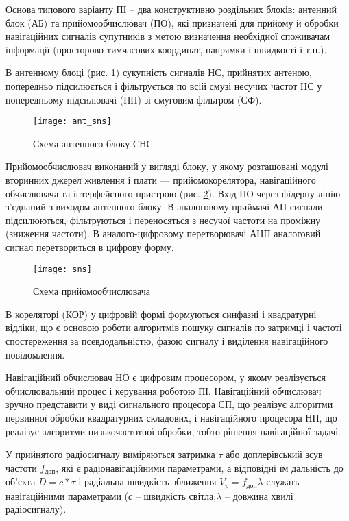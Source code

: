 Основа типового варіанту ПІ -- два конструктивно роздільних блоків: антенний блок (АБ) та 
прийомообчислювач (ПО), які призначені для прийому й обробки навігаційних сигналів 
супутників з метою визначення необхідної споживачам інформації (просторово-тимчасових 
координат, напрямки і швидкості і т.п.).

В антенному блоці (рис. \ref{fig:ant_sns}) сукупність сигналів НС, прийнятих антеною, попередньо 
підсилюється і фільтрується по всій смузі несучих частот НС у попередньому підсилювачі 
(ПП) зі смуговим фільтром (СФ). 
\begin{figure}[here]
\centering
\texttt{[image: ant\_sns]}
\caption{Схема антенного блоку СНС}
\label{fig:ant_sns}
\end{figure} 

Прийомообчислювач виконаний у вигляді блоку, у якому розташовані модулі вторинних 
джерел живлення і плати --- прийомокорелятора, навігаційного обчислювача та інтерфейсного 
пристрою (рис. \ref{fig:sns}). Вхід ПО через фідерну лінію з'єднаний з виходом антенного блоку. 
В аналоговому приймачі АП сигнали підсилюються, фільтруються і переносяться з несучої 
частоти на проміжну (зниження частоти). В аналого-цифровому перетворювачі АЦП аналоговий
сигнал перетвориться в цифрову форму.
\begin{figure}[here]
\centering
\texttt{[image: sns]}
\caption{Схема прийомообчислювача}
\label{fig:sns}
\end{figure} 
В кореляторі (КОР) у цифровій формі формуються синфазні  і квадратурні  відліки, що є 
основою роботи алгоритмів пошуку сигналів по затримці і частоті спостереження за псевдодальністю, 
фазою сигналу і виділення навігаційного повідомлення.

Навігаційний обчислювач НО є цифровим процесором, у якому реалізується обчислювальний процес 
і керування роботою ПІ. Навігаційний обчислювач зручно представити у виді сигнального процесора 
СП, що реалізує алгоритми первинної обробки квадратурних складових, і навігаційного процесора 
НП, що реалізує алгоритми низькочастотної обробки, тобто рішення навігаційної задачі.

У прийнятого радіосигналу виміряються затримка $\tau$ або доплерівський зсув частоти $f_{\text{доп}}$, 
які є радіонавігаційними параметрами, а відповідні їм дальність до об'єкта $D=c*\tau$  
і радіальна швидкість зближення $V_{p}=f_{\text{доп}}\lambda$   служать навігаційними параметрами 
(\textit{с } -- швидкість світла;$\lambda$ -- довжина хвилі радіосигналу).

